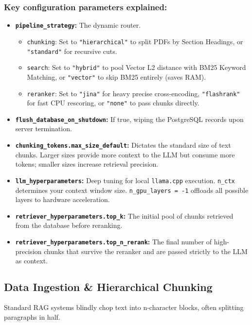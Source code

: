 \documentclass[11pt, a4paper]{article}
\begin{document}
\subsubsection{Key configuration parameters explained:}
\begin{itemize}
    \item \textbf{\texttt{pipeline\_strategy}:} The dynamic router. 
    \begin{itemize}
        \item \texttt{chunking}: Set to \texttt{"hierarchical"} to split PDFs by Section Headings, or \texttt{"standard"} for recursive cuts.
        \item \texttt{search}: Set to \texttt{"hybrid"} to pool Vector L2 distance with BM25 Keyword Matching, or \texttt{"vector"} to skip BM25 entirely (saves RAM).
        \item \texttt{reranker}: Set to \texttt{"jina"} for heavy precise cross-encoding, \texttt{"flashrank"} for fast CPU rescoring, or \texttt{"none"} to pass chunks directly.
    \end{itemize}
    \item \textbf{\texttt{flush\_database\_on\_shutdown}:} If true, wiping the PostgreSQL records upon server termination.
    \item \textbf{\texttt{chunking\_tokens.max\_size\_default}:} Dictates the standard size of text chunks. Larger sizes provide more context to the LLM but consume more tokens; smaller sizes increase retrieval precision.
    \item \textbf{\texttt{llm\_hyperparameters}:} Deep tuning for local \texttt{llama.cpp} execution. \texttt{n\_ctx} determines your context window size. \texttt{n\_gpu\_layers = -1} offloads all possible layers to hardware acceleration.
    \item \textbf{\texttt{retriever\_hyperparameters.top\_k}:} The initial pool of chunks retrieved from the database before reranking.
    \item \textbf{\texttt{retriever\_hyperparameters.top\_n\_rerank}:} The final number of high-precision chunks that survive the reranker and are passed strictly to the LLM as context.
\end{itemize}

\subsection{Data Ingestion \& Hierarchical Chunking}
Standard RAG systems blindly chop text into n-character blocks, often splitting paragraphs in half. 
\end{document}
